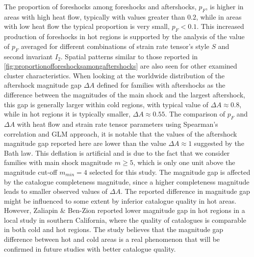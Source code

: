 \documentclass[12pt]{article} %
\theoremstyle{plain}
\begin{document}
	The proportion of foreshocks among foreshocks and aftershocks, $p_F$, is higher in areas with high heat flow, typically with values greater than $0.2$, while in areas with low heat flow the typical proportion is very small, $p_F<0.1$. This increased production of foreshocks in hot regions is supported by the analysis of the value of $p_F$ averaged for different combinations of strain rate tensor's style $S$ and second invariant $I_2$. Spatial patterns similar to those reported in \ref{fig:proportionofforeshocksamongaftershocks} are also seen for other examined cluster characteristics. 
	When looking at the worldwide distribution of the aftershock magnitude gap $\Delta A$ defined for families with aftershocks as the difference between the magnitudes of the main shock and the largest aftershock, this gap is generally larger within cold regions, with typical value of $\Delta A \approx 0.8$, while in hot regions it is typically smaller, $\Delta A \approx 0.55$. The comparison of $p_F$ and $\Delta A$ with heat flow and strain rate tensor parameters using Spearman's correlation and GLM approach, it is notable that the values of the aftershock magnitude gap reported here are lower than the value $\Delta A \approx 1$ suggested by the Bath law. This deflation is artificial and is due to the fact that we consider families with main shock magnitude $m \geq 5$, which is only one unit above the magnitude cut-off $m_{min} = 4$ selected for this study. The magnitude gap is affected by the catalogue completeness magnitude, since a higher completeness magnitude leads to smaller observed values of $\Delta A$. The reported difference in magnitude gap might be influenced to some extent by inferior catalogue quality in hot areas. However, Zaliapin $\&$ Ben-Zion reported lower magnitude gap in hot regions in a local study in southern California, where the quality of catalogues is comparable in both cold and hot regions. The study believes that the magnitude gap difference between hot and cold areas is a real phenomenon that will be confirmed in future studies with better catalogue quality.
	
\end{document}
